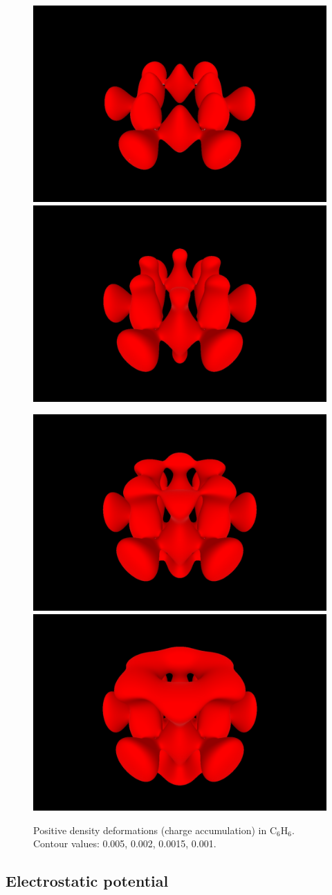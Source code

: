 \documentclass[10pt]{article}
\begin{document}
\begin{figure}[H]
\begin{center}
\includegraphics[width=.4\linewidth]{C6H6-pVQZ-def-0p005.png}
\hspace*{5mm}
\includegraphics[width=.4\linewidth]{C6H6-pVQZ-def-0p002.png}

\includegraphics[width=.4\linewidth]{C6H6-pVQZ-def-0p0015.png}
\hspace*{5mm}
\includegraphics[width=.4\linewidth]{C6H6-pVQZ-def-0p001.png}
\end{center}
\caption[Charge accumulation in C$_6$H$_6$]{ Positive density deformations (charge accumulation) in C$_6$H$_6$.
Contour values: 0.005, 0.002, 0.0015, 0.001.
\label{fig:6_3_3}}
\end{figure}


\subsection{Electrostatic potential \label{sec:6.4} }
\end{document}
